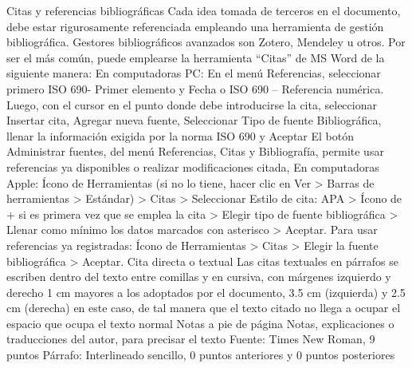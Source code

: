 Citas y referencias
bibliográficas
Cada idea tomada de terceros en el documento, debe estar rigurosamente
referenciada empleando una herramienta de gestión bibliográfica.
Gestores bibliográficos avanzados son Zotero, Mendeley u otros.
Por ser el más común, puede emplearse la herramienta “Citas” de MS Word de la
siguiente manera:
En computadoras PC: En el menú Referencias, seleccionar primero ISO 690-
Primer elemento y Fecha o ISO 690 – Referencia numérica. Luego, con el cursor en
el punto donde debe introducirse la cita, seleccionar Insertar cita, Agregar nueva
fuente, Seleccionar Tipo de fuente Bibliográfica, llenar la información exigida por
la norma ISO 690 y Aceptar
El botón Administrar fuentes, del menú Referencias, Citas y Bibliografía, permite
usar referencias ya disponibles o realizar modificaciones citada,
En computadoras Apple: Ícono de Herramientas (si no lo tiene, hacer clic en Ver
> Barras de herramientas > Estándar) > Citas > Seleccionar Estilo de cita: APA >
Ícono de + si es primera vez que se emplea la cita > Elegir tipo de fuente
bibliográfica > Llenar como mínimo los datos marcados con asterisco > Aceptar.
Para usar referencias ya registradas: Ícono de Herramientas > Citas > Elegir la
fuente bibliográfica > Aceptar.
Cita directa o textual
Las citas textuales en párrafos se escriben dentro del texto entre comillas y en
cursiva, con márgenes izquierdo y derecho 1 cm mayores a los adoptados por el
documento, 3.5 cm (izquierda) y 2.5 cm (derecha) en este caso, de tal manera que el
texto citado no llega a ocupar el espacio que ocupa el texto normal
Notas a pie de página
Notas, explicaciones o traducciones del autor, para precisar el texto
Fuente: Times New Roman, 9 puntos
Párrafo: Interlineado sencillo, 0 puntos anteriores y 0 puntos posteriores




